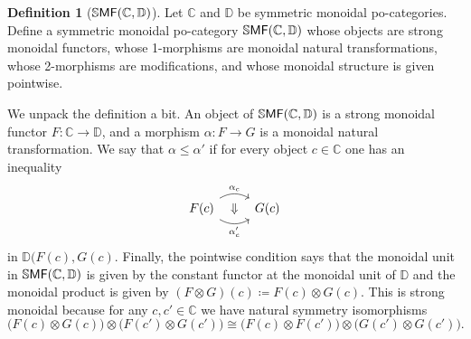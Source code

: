 \documentclass[11pt, oneside, article]{memoir}
\theoremstyle{plain}
\theoremstyle{definition}
\newtheorem{definition}[theorem]{Definition}
\theoremstyle{remark}
\newcommand{\Cat}[1]{{\mathsf{#1}}}%
\newcommand{\CCat}[1]{\mathbb{\StrLeft{#1}{1}}\Cat{\StrGobbleLeft{#1}{1}}}%
\newcommand{\ssmf}{\CCat{SMF}}
\newcommand{\cc}{\mathbb{C}}
\newcommand{\dd}{\mathbb{D}}
\begin{document}
\begin{definition}[$\ssmf(\cc,\dd)$]\label{def.smf}
Let $\cc$ and $\dd$ be symmetric monoidal po-categories. Define a symmetric monoidal po-category $\ssmf(\cc,\dd)$ whose objects are strong monoidal functors, whose 1-morphisms are monoidal natural transformations, whose 2-morphisms are modifications, and whose monoidal structure is given pointwise.
\end{definition}
We unpack the definition a bit. An object of $\ssmf(\cc,\dd)$ is a strong monoidal functor $F\colon\cc\to\dd$, and a morphism $\alpha\colon F\to G$ is a monoidal natural transformation. We say that $\alpha\leq\alpha'$ if for every object $c\in\cc$ one has an inequality
\[
\begin{tikzcd}
	F(c)\ar[r, bend left, "\alpha_c"]\ar[r, bend right, "\alpha'_c"']\ar[r, phantom, "\Downarrow"]&
	G(c)
\end{tikzcd}
\]
in $\dd(F(c),G(c)$. Finally, the pointwise condition says that the monoidal unit in $\ssmf(\cc,\dd)$ is given by the constant functor at the monoidal unit of $\dd$ and the monoidal product is given by $(F\otimes G)(c)\coloneqq F(c)\otimes G(c).$ This is strong monoidal because for any $c,c'\in\cc$ we have natural symmetry isomorphisms
\[
	\big(F(c)\otimes G(c)\big)\otimes\big(F(c')\otimes G(c')\big)
	\cong
	\big(F(c)\otimes F(c')\big)\otimes\big(G(c')\otimes G(c')\big).
\]
\end{document}

